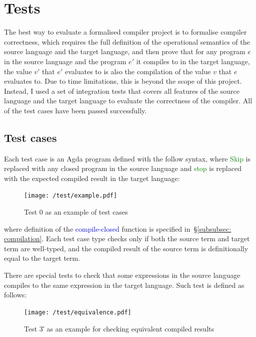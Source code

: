\documentclass[12pt,a4paper]{report}
\theoremstyle{definition}
\newcommand{\secref}[1]{\S\ref{#1}}
\newcommand{\mb}[1]{\textcolor{mediumblue}{#1}}
\newcommand{\gn}[1]{\textcolor{green}{#1}}
\begin{document}
    \section{Tests}
    The best way to evaluate a formalised compiler project is to formalise compiler correctness, which requires the full definition of the operational semantics of the source language and the target language, and then prove that for any program $e$ in the source language and the program $e'$ it compiles to in the target language, the value $v'$ that $e'$ evaluates to is also the compilation of the value $v$ that $e$ evaluates to. Due to time limitations, this is beyond the scope of this project. Instead, I used a set of integration tests that covers all features of the source language and the target language to evaluate the correctness of the compiler. All of the test cases have been passed successfully.

    \subsection{Test cases}
    Each test case is an Agda program defined with the follow syntax, where \gn{\textsf{Skip}} is replaced with any closed program in the source language and \gn{\textsf{stop}} is replaced with the expected compiled result in the target language:
    \begin{figure}[H]
        \centering
        \texttt{[image: /test/example.pdf]}
        \caption{Test 0 as an example of test cases}
        \label{fig: test_case_0}
    \end{figure}
    where definition of the \mb{\textsf{compile-closed}} function is specified in~\secref{subsubsec: compilation}. Each test case type checks only if both the source term and target term are well-typed, and the compiled result of the source term is definitionally equal to the target term.

    There are special tests to check that some expressions in the source language compiles to the same expression in the target language. Such test is defined as follows:
    \begin{figure}[H]
        \centering
        \texttt{[image: /test/equivalence.pdf]}
        \caption{Test 3′ as an example for checking equivalent compiled results}
        \label{fig: test_case_3′}
    \end{figure}
\end{document}

